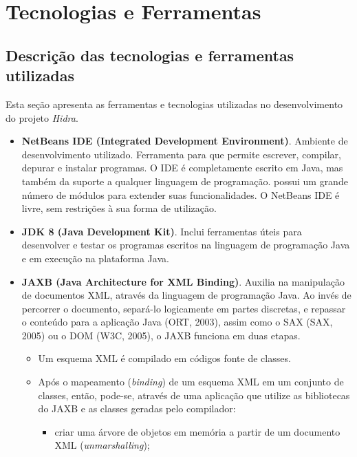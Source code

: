 \chapter{Tecnologias e Ferramentas} \label{chapter:ferramentas}

\section{Descrição das tecnologias e ferramentas utilizadas}
Esta seção apresenta as ferramentas e tecnologias utilizadas no desenvolvimento do projeto \textit{Hidra}.



\begin{itemize}
\item \textbf{NetBeans IDE (Integrated Development Environment)}. Ambiente de desenvolvimento utilizado. Ferramenta para que permite escrever, compilar, depurar e instalar programas. O IDE é completamente escrito em Java, mas também da suporte a qualquer linguagem de programação. possui um grande número de módulos para extender suas funcionalidades. O NetBeans IDE é livre, sem restrições à sua forma de utilização.

\item \textbf{JDK 8 (Java Development Kit)}. Inclui ferramentas úteis para desenvolver e testar os programas escritos na linguagem de programação Java e em execução na plataforma Java.

\item \textbf{JAXB (Java Architecture for XML Binding)}. Auxilia na manipulação de documentos XML, através da linguagem de programação Java. Ao invés de percorrer o documento, separá-lo logicamente em partes discretas, e repassar o conteúdo para a aplicação Java (ORT, 2003), assim como o SAX (SAX, 2005) ou o DOM (W3C, 2005), o JAXB funciona em duas etapas.
    \begin{itemize}
    \item Um esquema XML é compilado em códigos fonte de classes.
    
    \item Após o mapeamento (\textit{binding}) de um esquema XML em um conjunto de classes, então, pode-se, através de uma aplicação que utilize as bibliotecas do JAXB e as classes geradas pelo compilador:
        \begin{itemize}

        \item criar uma árvore de objetos em memória a partir de um documento XML (\textit{unmarshalling});
        

\end{itemize}
\end{itemize}
\end{itemize}
